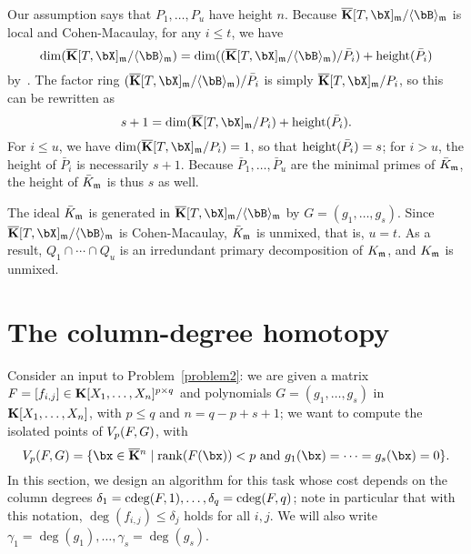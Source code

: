 \documentclass[12pt]{article}
\begin{document}
Our assumption says that $P_1,\dots,P_u$ have height $n$. Because
$\KKbar[T,\bX]_\m/\langle \bB \rangle_\m$ is local and Cohen-Macaulay, for any
$i \le t$, we have 
$$\dim(\KKbar[T,\bX]_\m/\langle \bB \rangle_\m)=\dim((\KKbar[T,\bX]_\m/\langle \bB \rangle_\m) / \bar P_i) + {\rm height}(\bar P_i)$$
by~\cite[Theorem~17.4(i)]{Matsumura86}.
The factor ring $(\KKbar[T,\bX]_\m/\langle \bB \rangle_\m) / \bar P_i$ is simply
$\KKbar[T,\bX]_\m/P_i$, so this can be rewritten as
$$s+1 = \dim(\KKbar[T,\bX]_\m/P_i) + {\rm height}(\bar P_i).$$ For $i\le
u$, we have $\dim(\KKbar[T,\bX]_\m/P_i)=1$, so that ${\rm height}(\bar
P_i)=s$; for $i > u$, the height of $\bar P_i$ is necessarily
$s+1$. Because $\bar P_1,\dots,\bar P_u$ are the minimal primes of
$\bar K_{\mathfrak{m}}$, the height of $\bar K_{\mathfrak{m}}$ is thus $s$ as well.

The ideal $\bar K_{\mathfrak{m}}$ is generated in $\KKbar[T,\bX]_\m/\langle \bB
\rangle_\m$ by $G=(g_1,\dots,g_s)$. Since $\KKbar[T,\bX]_\m/\langle
\bB \rangle_\m$ is Cohen-Macaulay, $\bar K_{\mathfrak{m}}$ is unmixed, that is,
$u=t$.  As a result, $Q_1 \cap \cdots \cap Q_u$ is an irredundant
primary decomposition of $K_{\mathfrak{m}}$, and $K_{\mathfrak{m}}$ is unmixed.


\section{The column-degree homotopy}\label{sec:columndegree}

Consider an input to Problem~\ref{problem2}: we are given a matrix
${F} =[f_{i,j}]\in \mathbf{K}[X_1,\dots,X_n]^{p \times q}$ and polynomials
$G=(g_1,\dots,g_s)$ in $\mathbf{K}[X_1,\dots,X_n]$, with $p \leq q$ and $n =
q-p+s+1$; we want to compute the isolated points of $V_{p}({F},G)$,
with
$$\VpFG{p}{\mF}{G} = \{\bx \in \KKbar{}^n \mid  \mathrm{rank}(\mF({\bx})) < p
\text{~and~} g_1(\bx)=\cdots=g_s(\bx)=0\}.$$
In this section, we design an algorithm for this task whose cost
depends on the column degrees
$\delta_1=\mathrm{cdeg}({F},1),\dots,\delta_q=\mathrm{cdeg}({F},q)$; note in
particular that with this notation, $\deg(f_{i,j}) \leq \delta_j$
holds for all $i,j$.  We will also write
$\gamma_1=\deg(g_1),\dots,\gamma_s=\deg(g_s)$.
\end{document}
